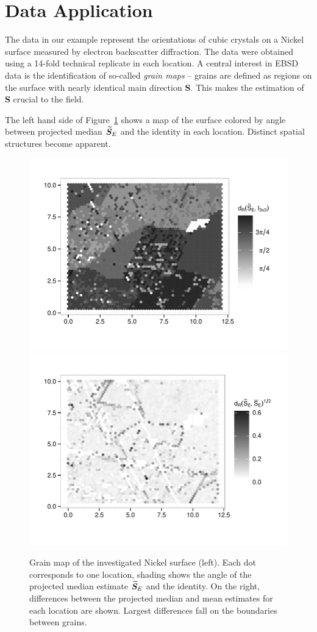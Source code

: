 \section{Data Application}\label{sec:data}

The data in our example represent the orientations of cubic crystals on a Nickel surface measured by electron backscatter diffraction. The data were obtained using a 14-fold technical replicate in each location. 
A central interest in EBSD data is the identification of so-called {\it grain maps} -- grains are defined as regions on the surface with nearly identical main direction $\bm S$. This makes the estimation of $\bm S$ crucial to the field. 


The left hand side of Figure~\ref{fig:grain-map} shows a  map of the surface colored by angle between projected median ${\widetilde{\bm S}_E}$ and the identity in each location. Distinct spatial structures become apparent.

\begin{figure}[htbp] %
   \centering
   \includegraphics[width=.49\textwidth]{images/grain-map.pdf} 
   \includegraphics[width=.49\textwidth]{images/grain-diff.pdf} 
   \caption{ \label{fig:grain-map}Grain map of the investigated Nickel surface (left). Each dot corresponds to one location, shading shows the angle of the projected median estimate ${\widetilde{\bm S}_E}$ and the identity. On the right, differences between the projected median and mean estimates for each location are shown. Largest differences fall on the boundaries between grains.}
\end{figure}


